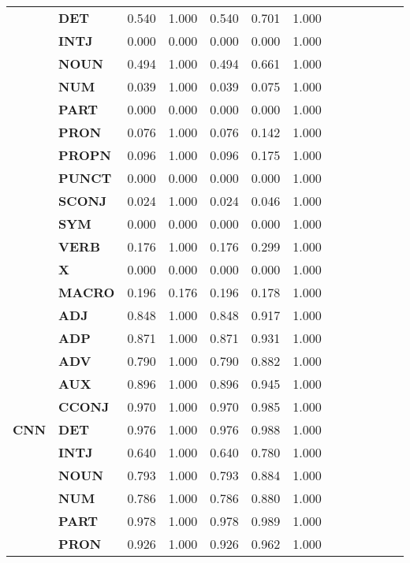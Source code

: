 \begin{longtable}{|l||l||l||l||l||l||l||l||l||l||l||l||l|}
\textbf{} & \textbf{DET} & 0.540 & 1.000 & 0.540 & 0.701 & 1.000 \\
\textbf{} & \textbf{INTJ} & 0.000 & 0.000 & 0.000 & 0.000 & 1.000 \\
\textbf{} & \textbf{NOUN} & 0.494 & 1.000 & 0.494 & 0.661 & 1.000 \\
\textbf{} & \textbf{NUM} & 0.039 & 1.000 & 0.039 & 0.075 & 1.000 \\
\textbf{} & \textbf{PART} & 0.000 & 0.000 & 0.000 & 0.000 & 1.000 \\
\textbf{} & \textbf{PRON} & 0.076 & 1.000 & 0.076 & 0.142 & 1.000 \\
\textbf{} & \textbf{PROPN} & 0.096 & 1.000 & 0.096 & 0.175 & 1.000 \\
\textbf{} & \textbf{PUNCT} & 0.000 & 0.000 & 0.000 & 0.000 & 1.000 \\
\textbf{} & \textbf{SCONJ} & 0.024 & 1.000 & 0.024 & 0.046 & 1.000 \\
\textbf{} & \textbf{SYM} & 0.000 & 0.000 & 0.000 & 0.000 & 1.000 \\
\textbf{} & \textbf{VERB} & 0.176 & 1.000 & 0.176 & 0.299 & 1.000 \\
\textbf{} & \textbf{X} & 0.000 & 0.000 & 0.000 & 0.000 & 1.000 \\
\textbf{} & \textbf{MACRO} & 0.196 & 0.176 & 0.196 & 0.178 & 1.000 \\
\cline{1-7}
\multirow[t]{18}{*}{\textbf{CNN}} & \textbf{ADJ} & 0.848 & 1.000 & 0.848 & 0.917 & 1.000 \\
\textbf{} & \textbf{ADP} & 0.871 & 1.000 & 0.871 & 0.931 & 1.000 \\
\textbf{} & \textbf{ADV} & 0.790 & 1.000 & 0.790 & 0.882 & 1.000 \\
\textbf{} & \textbf{AUX} & 0.896 & 1.000 & 0.896 & 0.945 & 1.000 \\
\textbf{} & \textbf{CCONJ} & 0.970 & 1.000 & 0.970 & 0.985 & 1.000 \\
\textbf{} & \textbf{DET} & 0.976 & 1.000 & 0.976 & 0.988 & 1.000 \\
\textbf{} & \textbf{INTJ} & 0.640 & 1.000 & 0.640 & 0.780 & 1.000 \\
\textbf{} & \textbf{NOUN} & 0.793 & 1.000 & 0.793 & 0.884 & 1.000 \\
\textbf{} & \textbf{NUM} & 0.786 & 1.000 & 0.786 & 0.880 & 1.000 \\
\textbf{} & \textbf{PART} & 0.978 & 1.000 & 0.978 & 0.989 & 1.000 \\
\textbf{} & \textbf{PRON} & 0.926 & 1.000 & 0.926 & 0.962 & 1.000 \\

\end{longtable}
